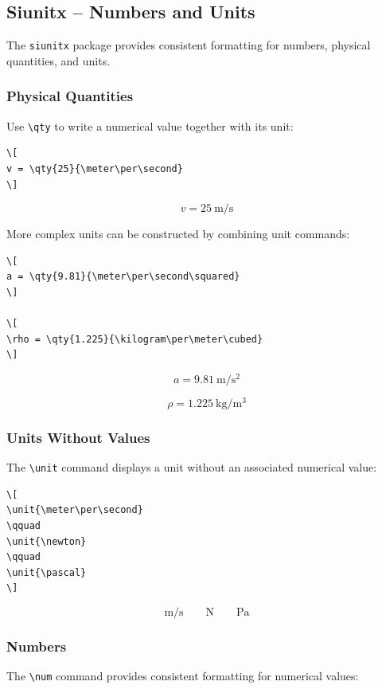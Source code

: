 \subsection{Siunitx -- Numbers and Units}

The \texttt{siunitx} package provides consistent formatting for
numbers, physical quantities, and units.


\subsubsection{Physical Quantities}

Use \verb|\qty| to write a numerical value together with its unit:

\begin{lstlisting}[style=latex]
\[
v = \qty{25}{\meter\per\second}
\]
\end{lstlisting}

\[
v = \qty{25}{\meter\per\second}
\]

More complex units can be constructed by combining unit commands:

\begin{lstlisting}[style=latex]
\[
a = \qty{9.81}{\meter\per\second\squared}
\]

\[
\rho = \qty{1.225}{\kilogram\per\meter\cubed}
\]
\end{lstlisting}

\[
a = \qty{9.81}{\meter\per\second\squared}
\]

\[
\rho = \qty{1.225}{\kilogram\per\meter\cubed}
\]


\subsubsection{Units Without Values}

The \verb|\unit| command displays a unit without an associated
numerical value:

\begin{lstlisting}[style=latex]
\[
\unit{\meter\per\second}
\qquad
\unit{\newton}
\qquad
\unit{\pascal}
\]
\end{lstlisting}

\[
\unit{\meter\per\second}
\qquad
\unit{\newton}
\qquad
\unit{\pascal}
\]


\subsubsection{Numbers}

The \verb|\num| command provides consistent formatting for
numerical values:

